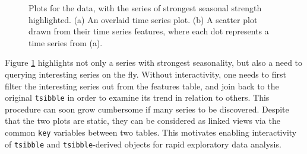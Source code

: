 \begin{Schunk}
\begin{figure}

{\centering {}

}

\caption[Plots for the  data, with the series of strongest seasonal strength highlighted]{Plots for the  data, with the series of strongest seasonal strength highlighted. (a) An overlaid time series plot. (b) A scatter plot drawn from their time series features, where each dot represents a time series from (a).}\label{fig:highlight-retail}
\end{figure}
\end{Schunk}

Figure \ref{fig:highlight-retail} highlights not only a series with
strongest seasonality, but also a need to querying interesting series on
the fly. Without interactivity, one needs to first filter the
interesting series out from the features table, and join back to the
original \texttt{tsibble} in order to examine its trend in relation to
others. This procedure can soon grow cumbersome if many series to be
discovered. Despite that the two plots are static, they can be
considered as linked views via the common \texttt{key} variables between
two tables. This motivates enabling interactivity of \texttt{tsibble}
and \texttt{tsibble}-derived objects for rapid exploratory data
analysis.

